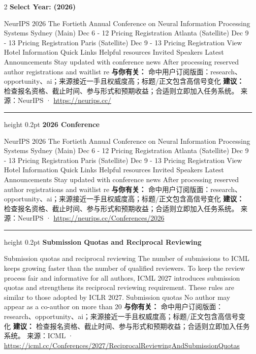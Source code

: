 \documentclass[10.5pt]{ctexart}
\begin{document}
\begin{multicols}{2}
{\large\bfseries Select Year: (2026)}\par
NeurIPS 2026 The Fortieth Annual Conference on Neural Information Processing Systems Sydney (Main) Dec 6 - 12 Pricing Registration Atlanta (Satellite) Dec 9 - 13 Pricing Registration Paris (Satellite) Dec 9 - 13 Pricing Registration View Hotel Information Quick Links Helpful resources Invited Speakers Latest Announcements Stay updated with conference news After processing reserved author registrations and waitlist re
\textbf{与你有关：} 命中用户订阅版面：research、opportunity、ai；来源接近一手且权威度高；标题/正文包含高信号变化
\textbf{建议：} 检查报名资格、截止时间、参与形式和预期收益；合适则立即加入任务系统。
{\footnotesize\color{ormuted} 来源：NeurIPS · \url{https://neurips.cc/}}
\vspace{2mm}
\hrule height 0.2pt
\vspace{2mm}
{\large\bfseries 2026 Conference}\par
NeurIPS 2026 The Fortieth Annual Conference on Neural Information Processing Systems Sydney (Main) Dec 6 - 12 Pricing Registration Atlanta (Satellite) Dec 9 - 13 Pricing Registration Paris (Satellite) Dec 9 - 13 Pricing Registration View Hotel Information Quick Links Helpful resources Invited Speakers Latest Announcements Stay updated with conference news After processing reserved author registrations and waitlist re
\textbf{与你有关：} 命中用户订阅版面：research、opportunity、ai；来源接近一手且权威度高；标题/正文包含高信号变化
\textbf{建议：} 检查报名资格、截止时间、参与形式和预期收益；合适则立即加入任务系统。
{\footnotesize\color{ormuted} 来源：NeurIPS · \url{https://neurips.cc/Conferences/2026}}
\vspace{2mm}
\hrule height 0.2pt
\vspace{2mm}
{\large\bfseries Submission Quotas and Reciprocal Reviewing}\par
Submission quotas and reciprocal reviewing The number of submissions to ICML keeps growing faster than the number of qualified reviewers. To keep the review process fair and informative for all authors, ICML 2027 introduces submission quotas and strengthens its reciprocal reviewing requirement. These rules are similar to those adopted by ICLR 2027. Submission quotas No author may appear as a co-author on more than 20
\textbf{与你有关：} 命中用户订阅版面：research、opportunity、ai；来源接近一手且权威度高；标题/正文包含高信号变化
\textbf{建议：} 检查报名资格、截止时间、参与形式和预期收益；合适则立即加入任务系统。
{\footnotesize\color{ormuted} 来源：ICML · \url{https://icml.cc/Conferences/2027/ReciprocalReviewingAndSubmissionQuotas}}

\end{multicols}
\end{document}
